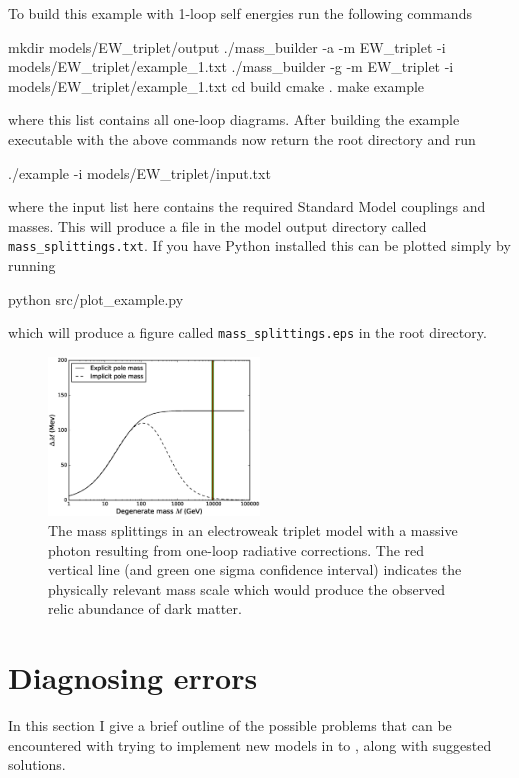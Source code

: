 To build this example with 1-loop self energies run the following commands
\begin{lstterm}
mkdir models/EW_triplet/output
./mass_builder -a -m EW_triplet -i models/EW_triplet/example_1.txt
./mass_builder -g -m EW_triplet -i models/EW_triplet/example_1.txt
cd build
cmake .
make example
\end{lstterm}
where this list contains all one-loop diagrams.  After building the example executable with the above commands now return the root directory and run
\begin{lstterm}
./example -i models/EW_triplet/input.txt
\end{lstterm}
where the input list here contains the required Standard Model couplings and masses.  This will produce a file in the model output directory called \lstinline{mass_splittings.txt}.  If you have Python installed this can be plotted simply by running
\begin{lstterm}
python src/plot_example.py
\end{lstterm}
which will produce a figure called \lstinline{mass_splittings.eps} in the \mb root directory.
\begin{figure}
\centering
\includegraphics[width=0.5\textwidth]{mass_splittings.eps}
\caption{The mass splittings in an electroweak triplet model with a massive photon resulting from one-loop radiative corrections.  The red vertical line (and green one sigma confidence interval) indicates the physically relevant mass scale which would produce the observed relic abundance of dark matter.}\label{fig:1_loop}
\end{figure}



\section{Diagnosing errors}\label{errors}

In this section I give a brief outline of the possible problems that can be encountered with trying to implement new models in to \mb, along with suggested solutions.

